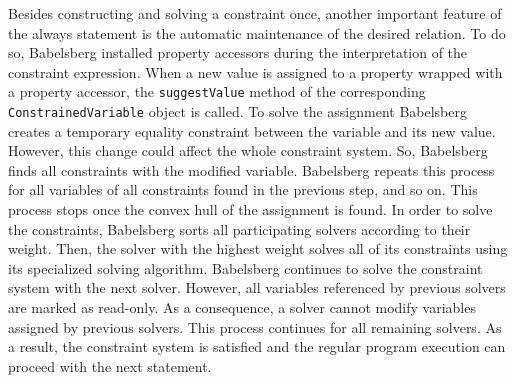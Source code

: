 Besides constructing and solving a constraint once, another important feature of the always statement is the automatic maintenance of the desired relation.
To do so, Babelsberg installed property accessors during the interpretation of the constraint expression.
When a new value is assigned to a property wrapped with a property accessor, the \texttt{suggestValue} method of the corresponding \texttt{ConstrainedVariable} object is called.
To solve the assignment Babelsberg creates a temporary equality constraint between the variable and its new value. However, this change could affect the whole constraint system. So, Babelsberg finds all constraints with the modified variable. Babelsberg repeats this process for all variables of all constraints found in the previous step, and so on. This process stops once the convex hull of the assignment is found.
In order to solve the constraints, Babelsberg sorts all participating solvers according to their weight. 
Then, the solver with the highest weight solves all of its constraints using its specialized solving algorithm.
Babelsberg continues to solve the constraint system with the next solver. However, all variables referenced by previous solvers are marked as read-only. As a consequence, a solver cannot modify variables assigned by previous solvers. This process continues for all remaining solvers. As a result, the constraint system is satisfied and the regular program execution can proceed with the next statement.


